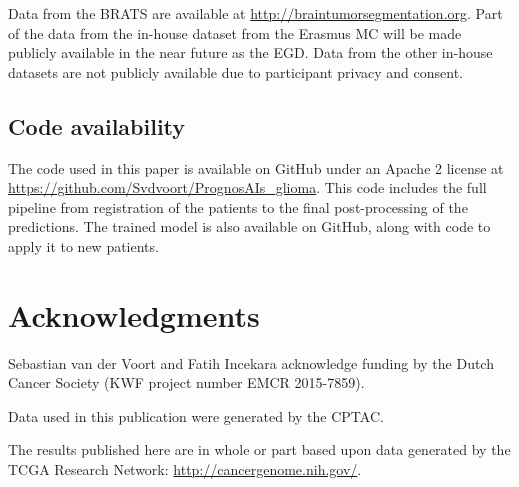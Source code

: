 Data from the \gls{BRATS} are available at \url{http://braintumorsegmentation.org}.
Part of the data from the in-house dataset from the Erasmus MC will be made publicly available in the near future as the \acrfull{EGD}.
Data from the other in-house datasets are not publicly available due to participant privacy and consent.

\subsection{Code availability}
The code used in this paper is available on GitHub under an Apache 2 license at \url{https://github.com/Svdvoort/PrognosAIs_glioma}.
This code includes the full pipeline from registration of the patients to the final post-processing of the predictions.
The trained model is also available on GitHub, along with code to apply it to new patients.

\section*{Acknowledgments}

Sebastian van der Voort and Fatih Incekara acknowledge funding by the Dutch Cancer Society (KWF project number EMCR 2015-7859).

Data used in this publication were generated by the \acrfull{CPTAC}.

The results published here are in whole or part based upon data generated by the TCGA Research Network: \url{http://cancergenome.nih.gov/}.


